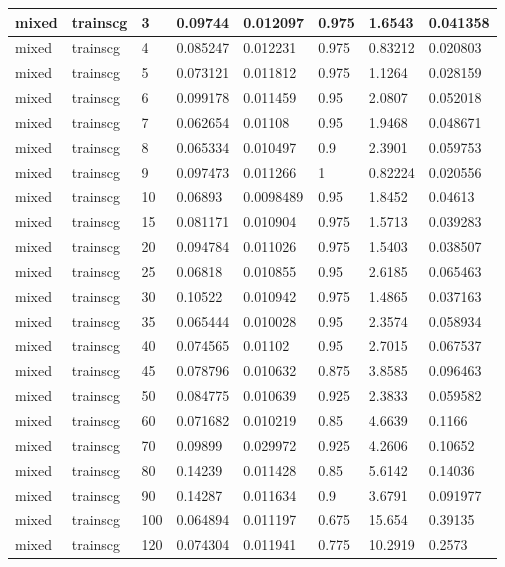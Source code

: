 \begin{longtable}{llllllll}
mixed & trainscg & 3 & 0.09744 & 0.012097 & 0.975 & 1.6543 & 0.041358 \\ \hline 
mixed & trainscg & 4 & 0.085247 & 0.012231 & 0.975 & 0.83212 & 0.020803 \\ \hline 
mixed & trainscg & 5 & 0.073121 & 0.011812 & 0.975 & 1.1264 & 0.028159 \\ \hline 
mixed & trainscg & 6 & 0.099178 & 0.011459 & 0.95 & 2.0807 & 0.052018 \\ \hline 
mixed & trainscg & 7 & 0.062654 & 0.01108 & 0.95 & 1.9468 & 0.048671 \\ \hline 
mixed & trainscg & 8 & 0.065334 & 0.010497 & 0.9 & 2.3901 & 0.059753 \\ \hline 
mixed & trainscg & 9 & 0.097473 & 0.011266 & 1 & 0.82224 & 0.020556 \\ \hline 
mixed & trainscg & 10 & 0.06893 & 0.0098489 & 0.95 & 1.8452 & 0.04613 \\ \hline 
mixed & trainscg & 15 & 0.081171 & 0.010904 & 0.975 & 1.5713 & 0.039283 \\ \hline 
mixed & trainscg & 20 & 0.094784 & 0.011026 & 0.975 & 1.5403 & 0.038507 \\ \hline 
mixed & trainscg & 25 & 0.06818 & 0.010855 & 0.95 & 2.6185 & 0.065463 \\ \hline 
mixed & trainscg & 30 & 0.10522 & 0.010942 & 0.975 & 1.4865 & 0.037163 \\ \hline 
mixed & trainscg & 35 & 0.065444 & 0.010028 & 0.95 & 2.3574 & 0.058934 \\ \hline 
mixed & trainscg & 40 & 0.074565 & 0.01102 & 0.95 & 2.7015 & 0.067537 \\ \hline 
mixed & trainscg & 45 & 0.078796 & 0.010632 & 0.875 & 3.8585 & 0.096463 \\ \hline 
mixed & trainscg & 50 & 0.084775 & 0.010639 & 0.925 & 2.3833 & 0.059582 \\ \hline 
mixed & trainscg & 60 & 0.071682 & 0.010219 & 0.85 & 4.6639 & 0.1166 \\ \hline 
mixed & trainscg & 70 & 0.09899 & 0.029972 & 0.925 & 4.2606 & 0.10652 \\ \hline 
mixed & trainscg & 80 & 0.14239 & 0.011428 & 0.85 & 5.6142 & 0.14036 \\ \hline 
mixed & trainscg & 90 & 0.14287 & 0.011634 & 0.9 & 3.6791 & 0.091977 \\ \hline 
mixed & trainscg & 100 & 0.064894 & 0.011197 & 0.675 & 15.654 & 0.39135 \\ \hline 
mixed & trainscg & 120 & 0.074304 & 0.011941 & 0.775 & 10.2919 & 0.2573 \\ \hline 

\end{longtable}
